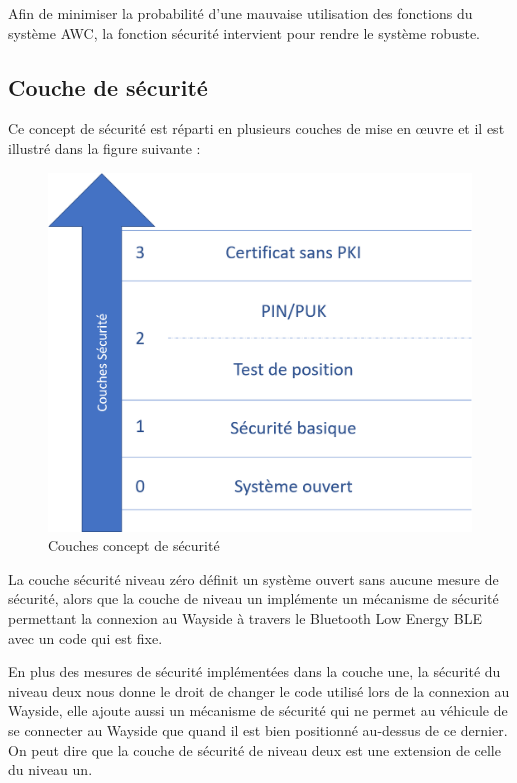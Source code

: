 Afin de minimiser la probabilité d'une mauvaise utilisation des fonctions du système AWC, la fonction sécurité intervient pour rendre le système robuste.

\subsection{Couche de sécurité}

Ce concept de sécurité est réparti en plusieurs couches de mise en œuvre et il est illustré dans la figure suivante : 

\begin{figure}[H]
 \centering
 \includegraphics[scale=0.8]{images/security_layers}
 \caption{Couches concept de sécurité}
\end{figure}

La couche sécurité niveau zéro définit un système ouvert sans aucune mesure de sécurité, alors que la couche de niveau un implémente un mécanisme de sécurité permettant la connexion au Wayside à travers le Bluetooth Low Energy BLE avec un code qui est fixe.

En plus des mesures de sécurité implémentées dans la couche une, la sécurité du niveau deux nous donne le droit de changer le code utilisé lors de la connexion au Wayside, elle ajoute aussi un mécanisme de sécurité qui ne permet au véhicule de se connecter au Wayside que quand il est bien positionné au-dessus de ce dernier. On peut dire que la couche de sécurité de niveau deux est une extension de celle du niveau un.

